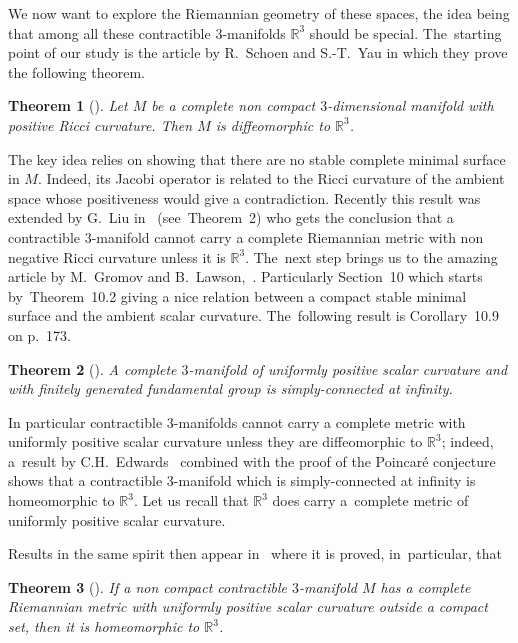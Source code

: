 \documentclass[10pt,a4paper]{amsart}
\numberwithin{equation}{section}
\newtheorem{theor}{Theorem}[section]
\begin{document}
We now want to explore the Riemannian geometry of these spaces, the idea being that among all these contractible $3$-manifolds $\mathbb{R}^{3}$ should be special. The~starting point of our study is the article
\cite{SchoenYau:stable} by R.~Schoen and S.-T.~Yau in which they prove the following theorem.

\begin{theor}[{\cite[Theorem~3]{SchoenYau:stable}}]
Let $M$ be a complete non compact $3$-dimensional manifold with positive Ricci curvature. Then $M$ is diffeomorphic to $\mathbb{R}^{3}$.
\end{theor}

The key idea relies on showing that there are no stable complete minimal surface in $M$. \mbox{Indeed}, its Jacobi operator is related to the Ricci curvature of the ambient space whose positiveness would give a contradiction. Recently this result was extended by G.~Liu in~\cite{Liu} (see~Theorem~2)
who gets the conclusion that a contractible $3$-manifold cannot carry a complete Riemannian metric with non negative Ricci curvature unless it is $\mathbb{R}^{3}$. The~next step brings us to the amazing article by M.~Gromov and B.~Lawson,~\cite{GromovLawson}. Particularly Section~10 which starts by~Theorem~10.2 giving a nice relation between a compact stable minimal surface and the ambient scalar curvature. The~following result is Corollary~10.9 on p.~173.

\begin{theor}[{\cite[Corollary~10.9]{GromovLawson}}]
A complete $3$-manifold of uniformly positive scalar curvature and with finitely generated fundamental group is simply-connected at infinity.
\end{theor}

In particular contractible $3$-manifolds cannot carry a complete metric with uniformly positive scalar curvature unless they are diffeomorphic to $\mathbb{R}^{3}$; indeed, a~result by C.H.~Edwards~\cite{Edw} combined
with the proof of the Poincar\'e conjecture shows that a contractible $3$-manifold which is simply-connected at infinity is homeomorphic to $\mathbb{R}^3$. Let us recall that $\mathbb{R}^3$ does carry a~complete metric of uniformly positive scalar curvature.

Results in the same spirit then appear in~\cite{cwy:taming} where it is proved, in~particular, that

\begin{theor}[{\cite[Theorem~4.4]{cwy:taming}}]\label{cwy}
If a non compact contractible $3$-manifold $M$ has a complete Riemannian metric with uniformly positive scalar curvature outside a compact set, then it is homeomorphic to $\mathbb{R}^{3}$.
\end{theor}
\end{document}
